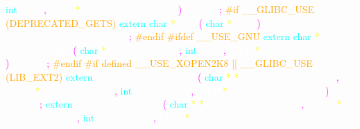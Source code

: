 \textcolor{cyan}{int} 
\textcolor{white}{\_\_n} 
\textcolor{magenta}{,} 
\textcolor{white}{FILE} 
\textcolor{yellow}{*} 
\textcolor{white}{\_\_restrict} 
\textcolor{white}{\_\_stream} 
\textcolor{magenta}{)} 
\textcolor{white}{\_\_wur} 
\textcolor{magenta}{;} 
\textcolor{orange}{\#if \_\_GLIBC\_USE (DEPRECATED\_GETS)} 
\textcolor{cyan}{extern} 
\textcolor{cyan}{char} 
\textcolor{yellow}{*} 
\textcolor{white}{gets} 
\textcolor{magenta}{(} 
\textcolor{cyan}{char} 
\textcolor{yellow}{*} 
\textcolor{white}{\_\_s} 
\textcolor{magenta}{)} 
\textcolor{white}{\_\_wur} 
\textcolor{white}{\_\_attribute\_deprecated\_\_} 
\textcolor{magenta}{;} 
\textcolor{orange}{\#endif} 
\textcolor{orange}{\#ifdef \_\_USE\_GNU} 
\textcolor{cyan}{extern} 
\textcolor{cyan}{char} 
\textcolor{yellow}{*} 
\textcolor{white}{fgets\_unlocked} 
\textcolor{magenta}{(} 
\textcolor{cyan}{char} 
\textcolor{yellow}{*} 
\textcolor{white}{\_\_restrict} 
\textcolor{white}{\_\_s} 
\textcolor{magenta}{,} 
\textcolor{cyan}{int} 
\textcolor{white}{\_\_n} 
\textcolor{magenta}{,} 
\textcolor{white}{FILE} 
\textcolor{yellow}{*} 
\textcolor{white}{\_\_restrict} 
\textcolor{white}{\_\_stream} 
\textcolor{magenta}{)} 
\textcolor{white}{\_\_wur} 
\textcolor{magenta}{;} 
\textcolor{orange}{\#endif} 
\textcolor{orange}{\#if defined \_\_USE\_XOPEN2K8 || \_\_GLIBC\_USE (LIB\_EXT2)} 
\textcolor{cyan}{extern} 
\textcolor{white}{\_\_ssize\_t} 
\textcolor{white}{\_\_getdelim} 
\textcolor{magenta}{(} 
\textcolor{cyan}{char} 
\textcolor{yellow}{*} 
\textcolor{yellow}{*} 
\textcolor{white}{\_\_restrict} 
\textcolor{white}{\_\_lineptr} 
\textcolor{magenta}{,} 
\textcolor{white}{size\_t} 
\textcolor{yellow}{*} 
\textcolor{white}{\_\_restrict} 
\textcolor{white}{\_\_n} 
\textcolor{magenta}{,} 
\textcolor{cyan}{int} 
\textcolor{white}{\_\_delimiter} 
\textcolor{magenta}{,} 
\textcolor{white}{FILE} 
\textcolor{yellow}{*} 
\textcolor{white}{\_\_restrict} 
\textcolor{white}{\_\_stream} 
\textcolor{magenta}{)} 
\textcolor{white}{\_\_wur} 
\textcolor{magenta}{;} 
\textcolor{cyan}{extern} 
\textcolor{white}{\_\_ssize\_t} 
\textcolor{white}{getdelim} 
\textcolor{magenta}{(} 
\textcolor{cyan}{char} 
\textcolor{yellow}{*} 
\textcolor{yellow}{*} 
\textcolor{white}{\_\_restrict} 
\textcolor{white}{\_\_lineptr} 
\textcolor{magenta}{,} 
\textcolor{white}{size\_t} 
\textcolor{yellow}{*} 
\textcolor{white}{\_\_restrict} 
\textcolor{white}{\_\_n} 
\textcolor{magenta}{,} 
\textcolor{cyan}{int} 
\textcolor{white}{\_\_delimiter} 
\textcolor{magenta}{,} 
\textcolor{white}{FILE} 
\textcolor{yellow}{*} 
\textcolor{white}{\_\_restrict} 
\textcolor{white}{\_\_stream} 
